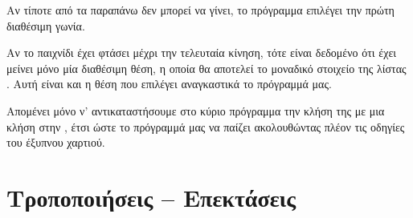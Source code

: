\documentclass[a4paper,11pt,oneside]{book}
\begin{document}
Αν τίποτε από τα παραπάνω δεν μπορεί να γίνει, το πρόγραμμα επιλέγει την πρώτη διαθέσιμη γωνία.


Αν το παιχνίδι έχει φτάσει μέχρι την τελευταία κίνηση, τότε είναι δεδομένο ότι έχει μείνει μόνο μία διαθέσιμη θέση, η οποία θα αποτελεί το μοναδικό στοιχείο της λίστας . Αυτή είναι και η θέση που επιλέγει αναγκαστικά το πρόγραμμά μας.


Απομένει μόνο ν' αντικαταστήσουμε στο κύριο πρόγραμμα την κλήση της  με μια κλήση στην , έτσι ώστε το πρόγραμμά μας να παίζει ακολουθώντας πλέον τις οδηγίες του έξυπνου χαρτιού.

\vspace{-3pt}


\section{Τροποποιήσεις -- Επεκτάσεις}


\end{document}
